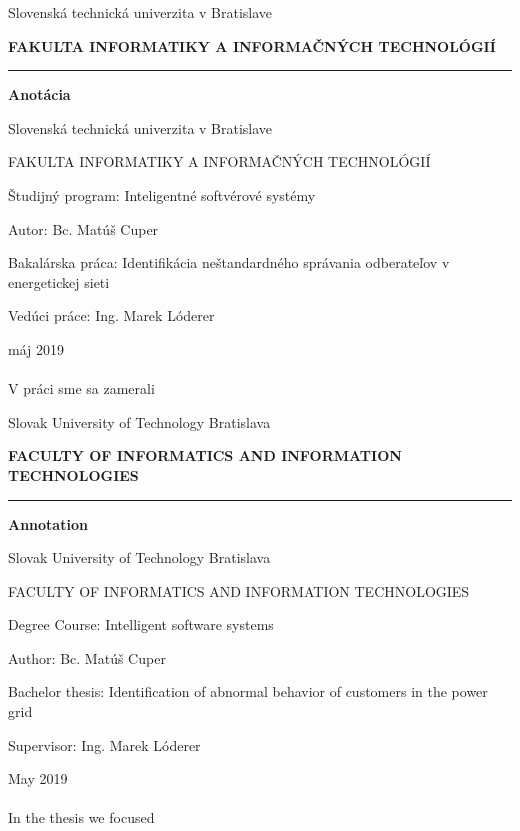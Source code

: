 \documentclass[a4paper,twoside,slovak,12pt]{article}
\begin{document}


\begin{titlepage}
\begin{center}
  {\small Slovenská technická univerzita v Bratislave \par}
  {\small \textbf{FAKULTA INFORMATIKY A INFORMAČNÝCH TECHNOLÓGIÍ}}
  \rule{\textwidth}{1pt}

  \vspace*{1.5cm}
  \begin{Large}
    \textbf{Anotácia} \par
  \end{Large}
\end{center}
{Slovenská technická univerzita v Bratislave \par}
{FAKULTA INFORMATIKY A INFORMAČNÝCH TECHNOLÓGIÍ \par}
{Študijný program: Inteligentné softvérové systémy \par}
{Autor: Bc. Matúš Cuper \par}
{Bakalárska práca: Identifikácia neštandardného správania odberateľov v energetickej sieti \par}
{Vedúci práce: Ing. Marek Lóderer \par}
{máj 2019 \\} \\
V práci sme sa zamerali
\end{titlepage}

\begin{titlepage}
\begin{center}
  {\small Slovak University of Technology Bratislava \par}
  {\small \textbf{FACULTY OF INFORMATICS AND INFORMATION TECHNOLOGIES}}
  \rule{\textwidth}{1pt}

  \vspace*{1.5cm}
  \begin{Large}
    \textbf{Annotation} \par
  \end{Large}
\end{center}
{Slovak University of Technology Bratislava \par}
{FACULTY OF INFORMATICS AND INFORMATION TECHNOLOGIES \par}
{Degree Course: Intelligent software systems \par}
{Author: Bc. Matúš Cuper \par}
{Bachelor thesis: Identification of abnormal behavior of customers in the power grid \par}
{Supervisor: Ing. Marek Lóderer \par}
{May 2019 \\} \\
In the thesis we focused
\end{titlepage}
\end{document}
